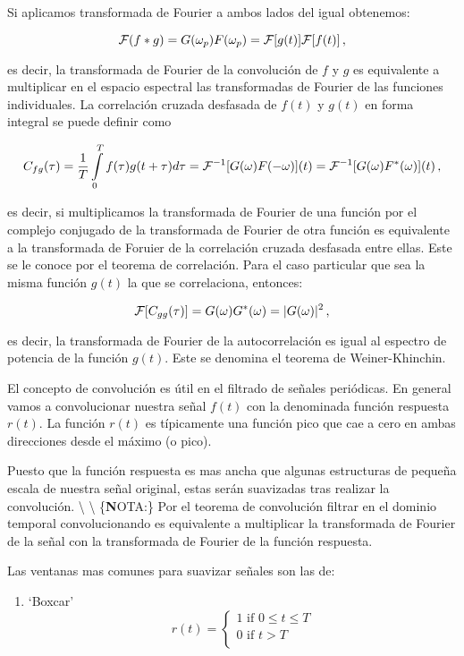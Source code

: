 \documentclass[
]{agujournal2019}
\providecommand{\tightlist}{%
  \setlength{\itemsep}{0pt}\setlength{\parskip}{0pt}}\usepackage{longtable,booktabs,array}
\begin{document}
Si aplicamos transformada de Fourier a ambos lados del igual obtenemos:

\[{\cal F}(f*g)=G(\omega_p)F(\omega_p)={\cal F}[g(t)]{\cal F}[f(t)]\,,\]

es decir, la transformada de Fourier de la convolución de \(f\) y \(g\)
es equivalente a multiplicar en el espacio espectral las transformadas
de Fourier de las funciones individuales. La correlación cruzada
desfasada de \(f(t)\) y \(g(t)\) en forma integral se puede definir como

\[C_{fg}(\tau)=\frac{1}{T}\int\limits^{T}_{0} f(\tau) g(t+\tau) d\tau={\cal F}^{-1}[G(\omega)F(-\omega)](t)=
{\cal F}^{-1}[G(\omega)F^*(\omega)](t)\,,\]

es decir, si multiplicamos la transformada de Fourier de una función por
el complejo conjugado de la transformada de Fourier de otra función es
equivalente a la transformada de Foruier de la correlación cruzada
desfasada entre ellas. Este se le conoce por el teorema de correlación.
Para el caso particular que sea la misma función \(g(t)\) la que se
correlaciona, entonces:

\[{\cal F}[C_{gg}(\tau)]=G(\omega)G^*(\omega)=|G(\omega)|^2\,,\]

es decir, la transformada de Fourier de la autocorrelación es igual al
espectro de potencia de la función \(g(t)\). Este se denomina el teorema
de Weiner-Khinchin.

El concepto de convolución es útil en el filtrado de señales periódicas.
En general vamos a convolucionar nuestra señal \(f(t)\) con la
denominada función respuesta \(r(t)\). La función \(r(t)\) es
típicamente una función pico que cae a cero en ambas direcciones desde
el máximo (o pico).

\begin{center}
\end{center}

Puesto que la función respuesta es mas ancha que algunas estructuras de
pequeña escala de nuestra señal original, estas serán suavizadas tras
realizar la convolución. \textbackslash{} \textbackslash{}
\{\textbf NOTA:\} Por el teorema de convolución filtrar en el dominio
temporal convolucionando es equivalente a multiplicar la transformada de
Fourier de la señal con la transformada de Fourier de la función
respuesta.

Las ventanas mas comunes para suavizar señales son las de:~

\begin{enumerate}
\def\labelenumi{(\arabic{enumi})}
\tightlist
\item
  `Boxcar' \begin{equation*}
    r(t)=
    \left\lbrace
    \begin{array}{l}
  1 \text{ if } 0\le t\le T \\
  0 \text{ if } t>T \\
    \end{array}
    \right.
  \end{equation*}
\end{enumerate}
\end{document}
